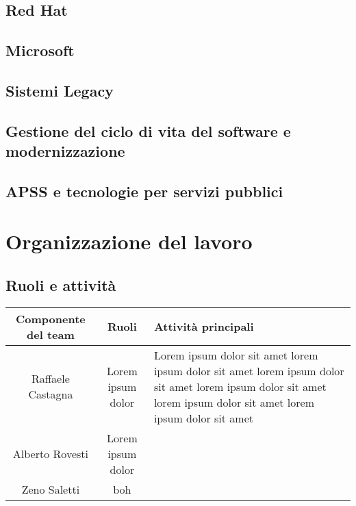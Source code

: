 \documentclass[11pt, a4paper]{article}
\theoremstyle{definition}
\begin{document}
\subsection{Red Hat}
\subsection{Microsoft}
\subsection{Sistemi Legacy}
\subsection{Gestione del ciclo di vita del software e modernizzazione}
\subsection{APSS e tecnologie per servizi pubblici}

\newpage
\section{Organizzazione del lavoro}
\subsection{Ruoli e attività}
\begin{center}
  \footnotesize
  \begin{tabularx}{\textwidth}{|c||c||X|}
      \hline
      \cellcolor{red!70}Componente del team & \cellcolor{red!70}Ruoli & \cellcolor{red!70}Attività principali\\
      \hline
      Raffaele Castagna & Lorem ipsum dolor & Lorem ipsum dolor sit amet lorem ipsum dolor sit amet lorem ipsum dolor sit amet lorem ipsum dolor sit amet lorem ipsum dolor sit amet lorem ipsum dolor sit amet\\
      \hline
      Alberto Rovesti & Lorem ipsum dolor &\\
      \hline
      Zeno Saletti & boh  &\\
      \hline
  \end{tabularx}
\end{center}
\end{document}
